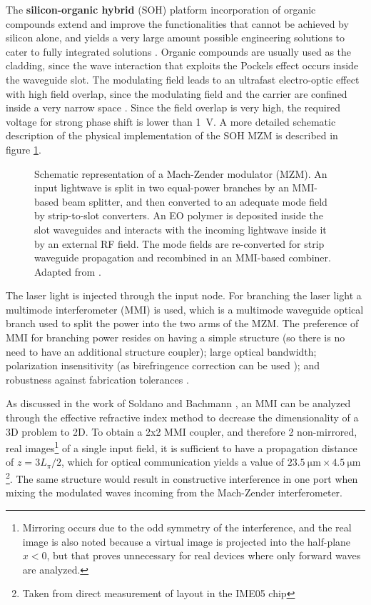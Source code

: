 The \textbf{silicon-organic hybrid} (SOH) platform incorporation of organic compounds extend and improve the functionalities that cannot be achieved by silicon alone, and yields a very large amount possible engineering solutions to cater to fully integrated solutions \cite{SOHPICKorn13}. Organic compounds are usually used as the cladding, since the wave interaction that exploits the Pockels effect occurs inside the waveguide slot. The modulating field leads to an ultrafast electro-optic effect with high field overlap, since the modulating field and the carrier are confined inside a very narrow space \cite{gateAlloatti12}. Since the field overlap is very high, the required voltage for strong phase shift is lower than \SI{1}{\volt}. A more detailed schematic description of the physical implementation of the SOH MZM is described in figure \ref{fig:SOHMZMsch}.

\begin{figure}[!ht]
\centering
  
  \caption{Schematic representation of a Mach-Zender modulator (MZM). An input lightwave is split in two equal-power branches by an MMI-based beam splitter, and then converted to an adequate mode field by strip-to-slot converters. An EO polymer is deposited inside the slot waveguides and interacts with the incoming lightwave inside it by an external RF field. The mode fields are re-converted for strip waveguide propagation and recombined in an MMI-based combiner. Adapted from \cite{Koos_SOH2015}.}
  \label{fig:SOHMZMsch}
\end{figure}

The laser light is injected through the input node. For branching the laser light a multimode interferometer (MMI) is used, which is a multimode waveguide optical branch used to split the power into the two arms of the MZM. The preference of MMI for branching power resides on having a simple structure (so there is no need to have an additional structure coupler); large optical bandwidth; polarization insensitivity (as birefringence correction can be used \cite{XipolMMI07}); and robustness against fabrication tolerances \cite{SoldanoMMI95}.

As discussed in the work of Soldano \cite{SoldanoMMI95} and Bachmann \cite{BachmannMMI94}, an MMI can be analyzed through the effective refractive index method to decrease the dimensionality of a 3D problem to 2D. To obtain a 2x2 MMI coupler, and therefore 2 non-mirrored, real images\footnote{Mirroring occurs due to the odd symmetry of the interference, and the real image is also noted because a virtual image is projected into the half-plane $x<0$, but that proves unnecessary for real devices where only forward waves are analyzed.} of a single input field, it is sufficient to have a propagation distance of $z=3L_\pi /2$, which for optical communication yields a value of $\SI{23.5}{\micro\meter} \times \SI{4.5}{\micro\meter}$\footnote{Taken from direct measurement of layout in the IME05 chip}. The same structure would result in constructive interference in one port when mixing the modulated waves incoming from the Mach-Zender interferometer.

